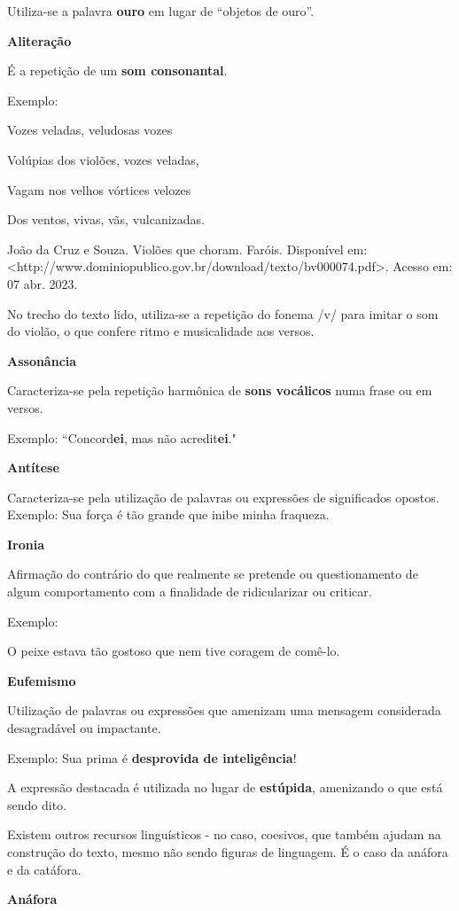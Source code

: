 {Utiliza-se a palavra \textbf{ouro} em lugar de ``objetos de ouro''.

\textbf{Aliteração}

É a repetição de um \textbf{som consonantal}.

Exemplo:

Vozes veladas, veludosas vozes

Volúpias dos violões, vozes veladas,

Vagam nos velhos vórtices velozes

Dos ventos, vivas, vãs, vulcanizadas.

João da Cruz e Souza. Violões que choram. Faróis. Disponível em:
\textless{}http://www.dominiopublico.gov.br/download/texto/bv000074.pdf\textgreater{}.
Acesso em: 07 abr. 2023.

No trecho do texto lido, utiliza-se a repetição do fonema /v/ para
imitar o som do violão, o que confere ritmo e musicalidade aos versos.

\textbf{Assonância}

Caracteriza-se pela repetição harmônica de \textbf{sons vocálicos} numa
frase ou em versos.

Exemplo: ``Concord\textbf{ei}, mas não acredit\textbf{ei}."

\textbf{Antítese}

Caracteriza-se pela utilização de palavras ou expressões de significados
opostos. Exemplo: Sua força é tão grande que inibe minha fraqueza.

\textbf{Ironia}

Afirmação do contrário do que realmente se pretende ou questionamento de
algum comportamento com a finalidade de ridicularizar ou criticar.

Exemplo:

O peixe estava tão gostoso que nem tive coragem de comê-lo.

\textbf{Eufemismo}

Utilização de palavras ou expressões que amenizam uma mensagem
considerada desagradável ou impactante.

Exemplo: Sua prima é \textbf{desprovida de inteligência}!

A expressão destacada é utilizada no lugar de \textbf{estúpida},
amenizando o que está sendo dito.

Existem outros recursos linguísticos - no caso, coesivos, que também
ajudam na construção do texto, mesmo não sendo figuras de linguagem. É o
caso da anáfora e da catáfora.

\textbf{Anáfora}

}
